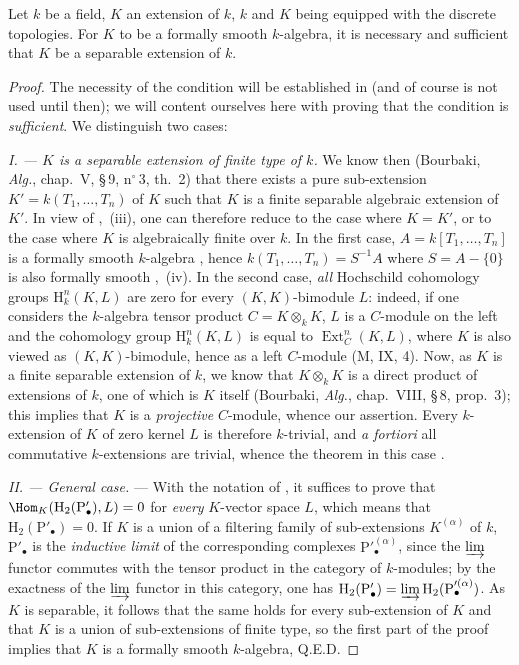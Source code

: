 \begin{theorem}[19.6.1 (Cohen)]
\label{0.19.6.1}
Let $k$ be a field, $K$ an extension of $k$, $k$ and $K$ being equipped with the discrete topologies.
For $K$ to be a formally smooth $k$-algebra, it is necessary and sufficient that $K$ be a separable extension of $k$.
\end{theorem}

\begin{proof}
The necessity of the condition will be established in  (and of course is not used until then);
we will content ourselves here with proving that the condition is \emph{sufficient}.
We distinguish two cases:

\emph{I. --- $K$ is a separable extension of finite type of $k$.}
We know then (Bourbaki, \emph{Alg.}, chap.~V, \S\,9, n$^\circ$\,3, th.~2) that there exists a pure sub-extension $K'=k(T_1,\ldots,T_n)$ of $K$ such that $K$ is a finite separable algebraic extension of $K'$.
  In view of ,~(iii), one can therefore reduce to the case where $K=K'$, or to the case where $K$ is algebraically finite over $k$.
In the first case, $A=k[T_1,\ldots,T_n]$ is a formally smooth $k$-algebra , hence $k(T_1,\ldots,T_n)=S^{-1}A$ where $S=A-\{0\}$ is also formally smooth ,~(iv).
In the second case, \emph{all} Hochschild cohomology groups $\mathrm{H}^n_k(K,L)$ are zero for every $(K,K)$-bimodule $L$:
indeed, if one considers the $k$-algebra tensor product $C=K\otimes_k K$, $L$ is a $C$-module on the left and the cohomology group $\mathrm{H}^n_k(K,L)$ is equal to $\operatorname{Ext}^n_C(K,L)$, where $K$ is also viewed as $(K,K)$-bimodule,
hence as a left $C$-module (M, IX, 4).
Now, as $K$ is a finite separable extension of $k$, we know that $K\otimes_k K$ is a direct product of extensions of $k$, one of which is $K$ itself (Bourbaki, \emph{Alg.}, chap.~VIII, \S\,8, prop.~3);
this implies that $K$ is a \emph{projective} $C$-module, whence our assertion.
Every $k$-extension of $K$ of zero kernel $L$ is therefore $k$-trivial, and \emph{a fortiori} all commutative $k$-extensions are trivial, whence the theorem in this case .

\emph{II. --- General case.} ---
With the notation of , it suffices to prove that $\Hom_K(\mathrm{H}_2(\mathrm{P}'_\bullet),L)=0$ for \emph{every} $K$-vector space $L$, which means that $\mathrm{H}_2(\mathrm{P}'_\bullet)=0$.
If $K$ is a union of a filtering family of sub-extensions $K^{(\alpha)}$ of $k$, $\mathrm{P}'_\bullet$ is the \emph{inductive limit} of the corresponding complexes $\mathrm{P}'^{(\alpha)}_\bullet$, since the $\varinjlim$ functor commutes with the tensor product in the category of $k$-modules;
by the exactness of the $\varinjlim$ functor in this category, one has $\mathrm{H}_2(\mathrm{P}'_\bullet)=\varinjlim\mathrm{H}_2(\mathrm{P}'^{(\alpha)}_\bullet)$.
As $K$ is separable, it follows that the same holds for every sub-extension of $K$ and that $K$ is a union of sub-extensions of finite type, so the first part of the proof implies that $K$ is a formally smooth $k$-algebra, Q.E.D.
\end{proof}

